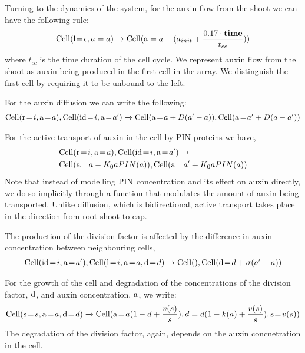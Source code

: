 Turning to the dynamics of the system, for the auxin flow from the shoot we can
have the following rule:
\begin{align*}
\mathrm{Cell}(\mathrm{l} \!=\! \epsilon, a=a) \xrightarrow{} \mathrm{Cell}(\mathrm{a}=a + (a_{init} + \frac{0.17 \cdot \mathbf{time}}{t_{cc}}))
\end{align*}
where $t_{cc}$ is the time duration of the cell cycle. We represent auxin flow
from the shoot as auxin being produced in the first cell in the array. We
distinguish the first cell by requiring it to be unbound to the left. 

For the auxin diffusion we can write the following:
\begin{align*}
\mr{Cell}(\ar{r}{i}, \ar{a}{a}), \mr{Cell}(\ar{id}{i}, \ar{a}{a'})
  \xrightarrow{} \mr{Cell}(\ar{a}{a + D(a'-a)}), \mr{Cell}(\ar{a}{a' + D(a - a')})
\end{align*}

For the active transport of auxin in the cell by PIN proteins we have,
\begin{align*}
& \mr{Cell}(\ar{r}{i}, \ar{a}{a}), \mr{Cell}(\ar{id}{i}, \ar{a}{a'})
                 \xrightarrow{} \\
  &\mr{Cell}(\ar{a}{a - K_0 a PIN(a)}), \mr{Cell}(\ar{a}{a' + K_0
  a PIN(a)})
\end{align*}
Note that instead of modelling $\mathrm{PIN}$ concentration and its effect on auxin
directly, we do so implicitly through a function that modulates the
amount of auxin being transported. Unlike diffusion, which is bidirectional,
active transport takes place in the direction from root shoot to cap.

The production of the division factor is affected by the difference in auxin
concentration between neighbouring cells,
\begin{align*}
\mr{Cell}(\ar{id}{i}, \ar{a}{a'}), \mr{Cell}(\ar{l}{i}, \ar{a}{a}, \ar{d}{d})
  \xrightarrow{} \mr{Cell}(), \mr{Cell}(\ar{d}{d+\sigma(a'-a)})
\end{align*}

For the growth of the cell and degradation of the concentrations of the division
factor, $\mathrm{d}$, and auxin concentration, $\mathrm{a}$, we write:
\begin{align*}
\mr{Cell}(\ar{s}{s}, \ar{a}{a}, \ar{d}{d}) \xrightarrow{} \mr{Cell}(\ar{a}{a (1 - d +
  \frac{v(s)}{s})}, d=d (1 - k(a) + \frac{v(s)}{s}), \ar{s}{v(s)})
\end{align*}
The degradation of the division factor, again, depends on the auxin
concnetration in the cell.

